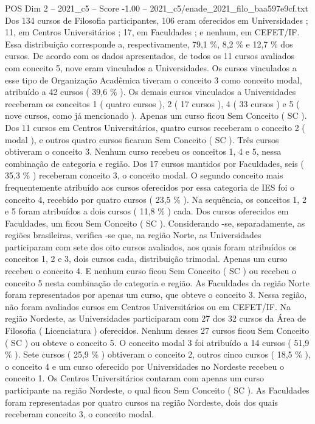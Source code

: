 \begin{textsample}{POS Dim 2 – 2021\_c5 – Score -1.00 – 2021\_c5/enade\_2021\_filo\_baa597e9cf.txt}
Dos 134 cursos de Filosofia participantes, 106 eram oferecidos em Universidades ; 11, em Centros Universitários ; 17, em Faculdades ; e nenhum, em CEFET/IF.
Essa distribuição corresponde a, respectivamente, 79,1 \%, 8,2 \% e 12,7 \% dos cursos.
De acordo com os dados apresentados, de todos os 11 cursos avaliados com conceito 5, nove eram vinculados a Universidades.
Os cursos vinculados a esse tipo de Organização Acadêmica tiveram o conceito 3 como conceito modal, atribuído a 42 cursos ( 39,6 \% ).
Os demais cursos vinculados a Universidades receberam os conceitos 1 ( quatro cursos ), 2 ( 17 cursos ), 4 ( 33 cursos ) e 5 ( nove cursos, como já mencionado ).
Apenas um curso ficou Sem Conceito ( SC ).
Dos 11 cursos em Centros Universitários, quatro cursos receberam o conceito 2 ( modal ), e outros quatro cursos ficaram Sem Conceito ( SC ).
Três cursos obtiveram o conceito 3.
Nenhum curso recebeu os conceitos 1, 4 e 5, nessa combinação de categoria e região.
Dos 17 cursos mantidos por Faculdades, seis ( 35,3 \% ) receberam conceito 3, o conceito modal.
O segundo conceito mais frequentemente atribuído aos cursos oferecidos por essa categoria de IES foi o conceito 4, recebido por quatro cursos ( 23,5 \% ).
Na sequência, os conceitos 1, 2 e 5 foram atribuídos a dois cursos ( 11,8 \% ) cada.
Dos cursos oferecidos em Faculdades, um ficou Sem Conceito ( SC ).
Considerando -se, separadamente, as regiões brasileiras, verifica -se que, na região Norte, as Universidades participaram com sete dos oito cursos avaliados, aos quais foram atribuídos os conceitos 1, 2 e 3, dois cursos cada, distribuição trimodal.
Apenas um curso recebeu o conceito 4.
E nenhum curso ficou Sem Conceito ( SC ) ou recebeu o conceito 5 nesta combinação de categoria e região.
As Faculdades da região Norte foram representados por apenas um curso, que obteve o conceito 3.
Nessa região, não foram avaliados cursos em Centros Universitários ou em CEFET/IF.
Na região Nordeste, as Universidades participaram com 27 dos 32 cursos da Área de Filosofia ( Licenciatura ) oferecidos.
Nenhum desses 27 cursos ficou Sem Conceito ( SC ) ou obteve o conceito 5.
O conceito modal 3 foi atribuído a 14 cursos ( 51,9 \% ).
Sete cursos ( 25,9 \% ) obtiveram o conceito 2, outros cinco cursos ( 18,5 \% ), o conceito 4 e um curso oferecido por Universidades no Nordeste recebeu o conceito 1.
Os Centros Universitários contaram com apenas um curso participante na região Nordeste, o qual ficou Sem Conceito ( SC ).
As Faculdades foram representadas por quatro cursos na região Nordeste, dois dos quais receberam conceito 3, o conceito modal.

\end{textsample}

